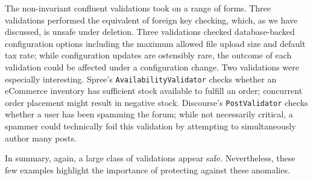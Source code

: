 The non-invariant confluent validations took on a range of
forms. Three validations performed the equivalent of foreign key
checking, which, as we have discussed, is unsafe under deletion. Three
validations checked database-backed configuration options including
the maximum allowed file upload size and default tax rate; while
configuration updates are ostensibly rare, the outcome of each
validation could be affected under a configuration change. Two
validations were especially interesting. Spree's
\texttt{AvailabilityValidator} checks whether an eCommerce inventory
has sufficient stock available to fulfill an order; concurrent order
placement might result in negative stock. Discourse's
\texttt{PostValidator} checks whether a user has been spamming the
forum; while not necessarily critical, a spammer could technically
foil this validation by attempting to simultaneously author many posts.

In summary, again, a large class of validations appear safe. Nevertheless,
these few examples highlight the importance of protecting against
these anomalies. 


